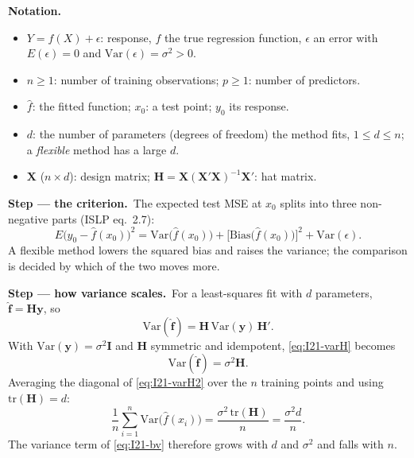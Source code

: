 \documentclass[11pt,a4paper]{article}
\numberwithin{equation}{questao}   %
\newenvironment{notacao}{\par\smallskip\noindent\textbf{Notation.}\begin{itemize}[leftmargin=1.4em,topsep=1pt,itemsep=0pt]\small}{\end{itemize}}
\newcommand{\passo}[2]{\par\smallskip\noindent\textbf{Step --- #1.}~#2}
\begin{document}
\begin{sol}
\begin{notacao}
\item $Y=f(X)+\epsilon$: response, $f$ the true regression function, $\epsilon$ an error with
  $E(\epsilon)=0$ and $\mathrm{Var}(\epsilon)=\sigma^2>0$.
\item $n\ge 1$: number of training observations; $p\ge 1$: number of predictors.
\item $\hat f$: the fitted function; $x_0$: a test point; $y_0$ its response.
\item $d$: the number of parameters (degrees of freedom) the method fits, $1\le d\le n$; a
  \emph{flexible} method has a large $d$.
\item $\mathbf X$ ($n\times d$): design matrix; $\mathbf H=\mathbf X(\mathbf X'\mathbf X)^{-1}\mathbf X'$: hat matrix.
\end{notacao}

\passo{the criterion}{The expected test MSE at $x_0$ splits into three non-negative parts
(ISLP eq.~2.7):
\begin{equation}\label{eq:I21-bv}
E\big(y_0-\hat f(x_0)\big)^2=\mathrm{Var}\big(\hat f(x_0)\big)+\big[\mathrm{Bias}\big(\hat f(x_0)\big)\big]^2+\mathrm{Var}(\epsilon).
\end{equation}
A flexible method lowers the squared bias and raises the variance; the comparison is decided by
which of the two moves more.}

\passo{how variance scales}{For a least-squares fit with $d$ parameters, $\hat{\mathbf f}=\mathbf H\mathbf y$, so
\begin{equation}\label{eq:I21-varH}
\mathrm{Var}(\hat{\mathbf f})=\mathbf H\,\mathrm{Var}(\mathbf y)\,\mathbf H'.
\end{equation}
With $\mathrm{Var}(\mathbf y)=\sigma^2\mathbf I$ and $\mathbf H$ symmetric and idempotent, \eqref{eq:I21-varH} becomes
\begin{equation}\label{eq:I21-varH2}
\mathrm{Var}(\hat{\mathbf f})=\sigma^2\mathbf H.
\end{equation}
Averaging the diagonal of \eqref{eq:I21-varH2} over the $n$ training points and using
$\mathrm{tr}(\mathbf H)=d$:
\begin{equation}\label{eq:I21-avgvar}
\frac1n\sum_{i=1}^n\mathrm{Var}\big(\hat f(x_i)\big)=\frac{\sigma^2\,\mathrm{tr}(\mathbf H)}{n}=\frac{\sigma^2 d}{n}.
\end{equation}
The variance term of \eqref{eq:I21-bv} therefore grows with $d$ and $\sigma^2$ and falls with $n$.}


\end{sol}
\end{document}
